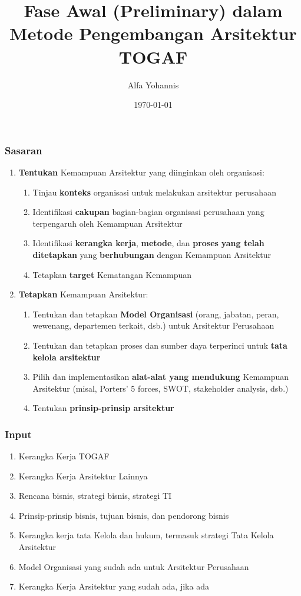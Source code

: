 \documentclass[aspectratio=169]{beamer}
\title{Fase Awal (Preliminary) dalam Metode Pengembangan Arsitektur TOGAF}
\author{Alfa Yohannis}
\date{\today}
\begin{document}
	
	\frame{\titlepage}
	
	\begin{frame}
		\frametitle{Sasaran}
		\begin{enumerate}
			\item \textbf{Tentukan} Kemampuan Arsitektur yang diinginkan oleh organisasi:
			\begin{enumerate}
				\item Tinjau \textbf{konteks} organisasi untuk melakukan arsitektur perusahaan
				\item Identifikasi \textbf{cakupan} bagian-bagian organisasi perusahaan yang terpengaruh oleh Kemampuan Arsitektur
				\item Identifikasi \textbf{kerangka kerja}, \textbf{metode}, dan \textbf{proses} \textbf{yang telah ditetapkan} yang \textbf{berhubungan} dengan Kemampuan Arsitektur
				\item Tetapkan \textbf{target} Kematangan Kemampuan
			\end{enumerate}
			\item \textbf{Tetapkan} Kemampuan Arsitektur:
			\begin{enumerate}
				\item Tentukan dan tetapkan \textbf{Model Organisasi} (orang, jabatan, peran, wewenang, departemen terkait, dsb.) untuk Arsitektur Perusahaan
				\item Tentukan dan tetapkan proses dan sumber daya terperinci untuk \textbf{tata kelola arsitektur}
				\item Pilih dan implementasikan \textbf{alat-alat yang mendukung} Kemampuan Arsitektur (misal, Porters' 5 forces, SWOT, stakeholder analysis, dsb.)
				\item Tentukan \textbf{prinsip-prinsip arsitektur}
			\end{enumerate}
		\end{enumerate}
		
	\end{frame}
	
	\begin{frame}
		\frametitle{Input}
		\begin{enumerate}
			\item Kerangka Kerja TOGAF
			\item Kerangka Kerja Arsitektur Lainnya
			\item Rencana bisnis, strategi bisnis, strategi TI
			\item Prinsip-prinsip bisnis, tujuan bisnis, dan pendorong bisnis
			\item Kerangka kerja tata Kelola dan hukum, termasuk strategi Tata Kelola Arsitektur
			\item Model Organisasi yang sudah ada untuk Arsitektur Perusahaan
			\item Kerangka Kerja Arsitektur yang sudah ada, jika ada
		\end{enumerate}
	\end{frame}
	
\end{document}
